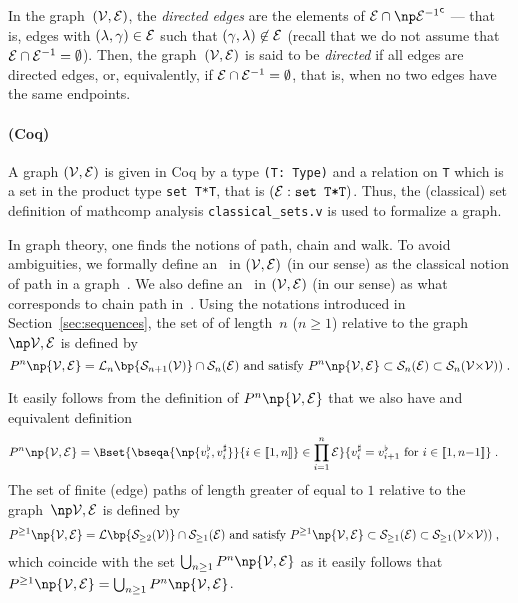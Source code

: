 \documentclass[12pt]{article}
\def\citep#1{\cite{#1}}
\begin{document}
{{In the graph~$({\cal V},{\cal E})$, 
the \emph{directed edges} are the elements of
$\EDGE \cap \npComplementary{ \Converse{\EDGE} }$ --- that is, 
edges with $(\lambda,\gamma)\in {\cal E}$ such that $(\gamma, \lambda)\not\in {\cal E}$
(recall that we do not assume that ${\cal E} \cap {\cal E}^{-1}=\emptyset$).
Then, the graph~$({\cal V},{\cal E})$ is said to be \emph{directed} if
all edges are directed edges, 
or, equivalently, if 
\( {\cal E} \cap {\cal E}^{-1}=\emptyset \), that is, 
when no two edges have the same endpoints.

\paragraph{(Coq)} A graph $({\cal V},{\cal E})$ is given in Coq by a type \texttt{(T: Type)} and a relation on
\texttt{T} which is a set in the product type \texttt{set T*T}, that is
$({\cal E}:\texttt{set T*T})$. Thus, the (classical) set definition of mathcomp
analysis \texttt{classical\_sets.v} is used to formalize a graph.
\medskip

In graph theory, one finds the notions of path, chain and walk. 
To avoid ambiguities,
we formally define an \EdgePath\ in $({\cal V},{\cal E})$ (in our sense) 
as the classical notion of path in a graph~\citep{Diestel}.
We also define an \undirectedEdgePath\ in $({\cal V},{\cal E})$ (in our sense)
as what corresponds to chain path in~\citep{Lauritzen-et-al-1990}.
\medskip
Using the notations introduced in Section~\ref{sec:sequences}, 
the set of \emph{\EdgePath} of length~$n$ ($n\ge 1$) relative to the graph~$\npOrientedGraph$ is defined by
\begin{equation}
  \PATH^n\np{\OrientedGraph} =
  \Lift_n \bp{ \Sequence_{n+1}(\VERTEX)} \cap \Sequence_{n}(\EDGE)
  \text{ and satisfy } \PATH^n\np{\OrientedGraph} \subset \Sequence_{n}(\EDGE) \subset \Sequence_{n}(\VERTEX{\times}\VERTEX))
  \eqfinp
\end{equation}

It easily follows from the definition of $\PATH^n\np{\OrientedGraph}$ that we also have and equivalent definition
\begin{align}
  \PATH^n\np{\OrientedGraph} %
  &=
    \Bset{ \bseqa{ \np{\tail{\vertex_i},\head{\vertex_i}} }{i\in\ic{1,n}} \in \SetProd{\EDGE}{n} }
    { \head{\vertex_i}=\tail{\vertex_{i+1}} \text{ for } i\in\ic{1,n{-}1}}
    \eqfinp
\end{align}
The set of finite (edge) paths of length greater of equal to $1$ relative to the graph~$\npOrientedGraph$ is defined by
\begin{align}
  \PATH^{\ge 1}\np{\OrientedGraph}
  &=
    \Lift\bp{ \Sequence_{\ge 2}(\VERTEX)} \cap \Sequence_{\ge 1}(\EDGE)
    \text{ and satisfy } \PATH^{\ge 1}\np{\OrientedGraph}  \subset \Sequence_{\ge 1}(\EDGE)  \subset \Sequence_{\ge 1}(\VERTEX{\times}\VERTEX))
    \eqfinv
    \label{def:epaths_gt1}
\end{align}
which coincide with the set $\bigcup_{n\ge 1} \PATH^n\np{\OrientedGraph}$ as it easily follows that
$\PATH^{\ge 1}\np{\OrientedGraph} = \bigcup_{n\ge 1} \PATH^n\np{\OrientedGraph}$.

}}
\end{document}
